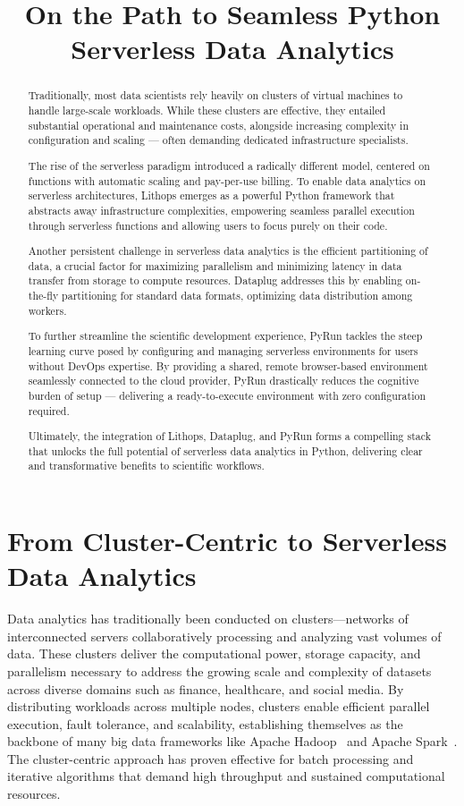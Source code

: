 \title{On the Path to Seamless Python Serverless Data Analytics}

\begin{abstract}
Traditionally, most data scientists rely heavily on clusters of virtual machines to handle large-scale workloads. While these clusters are effective, they entailed substantial operational and maintenance costs, alongside increasing complexity in configuration and scaling — often demanding dedicated infrastructure specialists.

The rise of the serverless paradigm introduced a radically different model, centered on functions with automatic scaling and pay-per-use billing. To enable data analytics on serverless architectures, Lithops emerges as a powerful Python framework that abstracts away infrastructure complexities, empowering seamless parallel execution through serverless functions and allowing users to focus purely on their code.

Another persistent challenge in serverless data analytics is the efficient partitioning of data, a crucial factor for maximizing parallelism and minimizing latency in data transfer from storage to compute resources. Dataplug addresses this by enabling on-the-fly partitioning for standard data formats, optimizing data distribution among workers.

To further streamline the scientific development experience, PyRun tackles the steep learning curve posed by configuring and managing serverless environments for users without DevOps expertise. By providing a shared, remote browser-based environment seamlessly connected to the cloud provider, PyRun drastically reduces the cognitive burden of setup — delivering a ready-to-execute environment with zero configuration required.

Ultimately, the integration of Lithops, Dataplug, and PyRun forms a compelling stack that unlocks the full potential of serverless data analytics in Python, delivering clear and transformative benefits to scientific workflows.
\end{abstract}

\section{From Cluster-Centric to Serverless Data Analytics}
Data analytics has traditionally been conducted on clusters—networks of interconnected servers collaboratively processing and analyzing vast volumes of data. These clusters deliver the computational power, storage capacity, and parallelism necessary to address the growing scale and complexity of datasets across diverse domains such as finance, healthcare, and social media. By distributing workloads across multiple nodes, clusters enable efficient parallel execution, fault tolerance, and scalability, establishing themselves as the backbone of many big data frameworks like Apache Hadoop~\citep{hadoop} and Apache Spark~\citep{spark}. The cluster-centric approach has proven effective for batch processing and iterative algorithms that demand high throughput and sustained computational resources.

